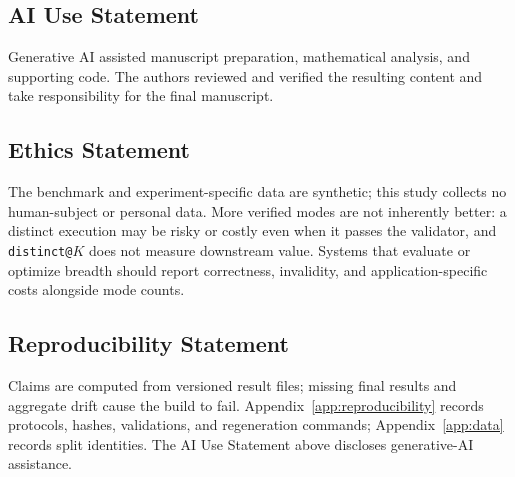 \subsection{AI Use Statement}
\label{sec:ai-use}

Generative AI assisted manuscript preparation, mathematical analysis, and
supporting code. The authors reviewed and verified the resulting content and
take responsibility for the final manuscript.

\subsection{Ethics Statement}

The benchmark and experiment-specific data are synthetic; this study collects
no human-subject or personal data. More verified modes are not inherently
better: a distinct execution may be risky or costly even when it passes the
validator, and \texttt{distinct@}$K$ does not measure downstream value. Systems
that evaluate or optimize breadth should report correctness, invalidity, and
application-specific costs alongside mode counts.

\subsection{Reproducibility Statement}

Claims are computed from versioned result files; missing final results and aggregate drift cause the build to
fail. Appendix~\ref{app:reproducibility} records protocols, hashes, validations,
and regeneration commands; Appendix~\ref{app:data} records split identities.
The AI Use Statement above discloses generative-AI assistance.


